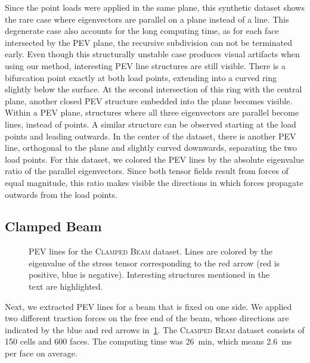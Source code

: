 %
Since the point loads were applied in the same plane, this synthetic dataset
shows the rare case where eigenvectors are parallel on a plane instead of a
line.
%
This degenerate case also accounts for the long computing time, as for each face
intersected by the \ac{PEV} plane, the recursive subdivision can not be terminated
early.
%
Even though this structurally unstable case produces visual artifacts when
using our method, interesting \ac{PEV} line structures are still visible.
%
There is a bifurcation point exactly at both load points, extending into a
curved ring slightly below the surface.
%
At the second intersection of this ring with the central plane, another closed
\ac{PEV} structure embedded into the plane becomes visible.
%
Within a \ac{PEV} plane, structures where all three eigenvectors are parallel become
lines, instead of points.
%
A similar structure can be observed starting at the load points and leading
outwards.
%
In the center of the dataset, there is another \ac{PEV} line, orthogonal to the
plane and slightly curved downwards, separating the two load points.
%
For this dataset, we colored the \ac{PEV} lines by the absolute eigenvalue ratio of
the parallel eigenvectors.
%
Since both tensor fields result from forces of equal magnitude, this ratio makes
visible the directions in which forces propagate outwards from the load points.
%
%
\subsection{Clamped Beam} %
\label{ssub:clamped_beam}
%
\begin{figure}[t]
    \setlength\figurewidth\textwidth
    \centering
    
    \caption{\ac{PEV} lines for the \textsc{Clamped Beam} dataset. Lines are
             colored by the eigenvalue of the stress tensor corresponding to the
             red arrow (red is positive, blue is negative). Interesting
             structures mentioned in the text are highlighted.}
    \label{fig:beam_full}
\end{figure}
%
Next, we extracted \ac{PEV} lines for a beam that is fixed on one side.
%
We applied two different traction forces on the free end of the beam, whose
directions are indicated by the blue and red arrows in~\cref{fig:beam_full}.
%
The \textsc{Clamped Beam} dataset consists of \num{150}\si{\kilo} cells and
\num{600}\si{\kilo} faces.
%
The computing time was \SI{26}{\minute}, which means \SI{2.6}{\milli\second}
per face on average.
%

